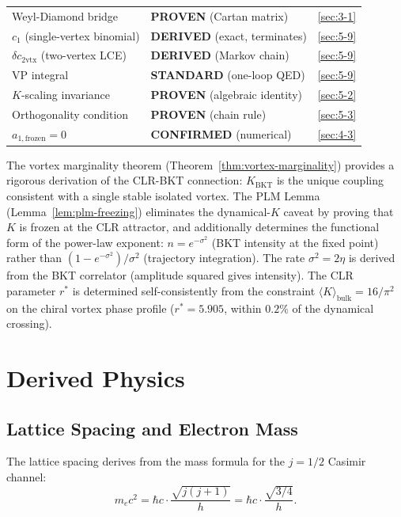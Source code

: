 \documentclass[aps,prd,onecolumn,superscriptaddress,floatfix,12pt]{revtex4-2}
\newcommand{\KBKT}{K_{\text{BKT}}}
\begin{document}
\begin{table}[t]
\begin{tabular}{llc}
Weyl-Diamond bridge & \textbf{PROVEN} (Cartan matrix) & \ref{sec:3-1} \\
$c_1$ (single-vertex binomial) & \textbf{DERIVED} (exact, terminates) & \ref{sec:5-9} \\
$\delta c_{2\text{vtx}}$ (two-vertex LCE) & \textbf{DERIVED} (Markov chain) & \ref{sec:5-9} \\
VP integral & \textbf{STANDARD} (one-loop QED) & \ref{sec:5-9} \\
$K$-scaling invariance & \textbf{PROVEN} (algebraic identity) & \ref{sec:5-2} \\
Orthogonality condition & \textbf{PROVEN} (chain rule) & \ref{sec:5-3} \\
$a_{1,\text{frozen}} = 0$ & \textbf{CONFIRMED} (numerical) & \ref{sec:4-3} \\
\bottomrule
\end{tabular}
\end{table}

The vortex marginality theorem (Theorem~\ref{thm:vortex-marginality}) provides a rigorous derivation of the CLR-BKT connection: $\KBKT$ is the unique coupling consistent with a single stable isolated vortex. The PLM Lemma (Lemma~\ref{lem:plm-freezing}) eliminates the dynamical-$K$ caveat by proving that $K$ is frozen at the CLR attractor, and additionally determines the functional form of the power-law exponent: $n = e^{-\sigma^2}$ (BKT intensity at the fixed point) rather than $(1 - e^{-\sigma^2})/\sigma^2$ (trajectory integration).  The rate $\sigma^2 = 2\eta$ is derived from the BKT correlator (amplitude squared gives intensity).  The CLR parameter $r^*$ is determined self-consistently from the constraint $\langle K \rangle_{\text{bulk}} = 16/\pi^2$ on the chiral vortex phase profile ($r^* = 5.905$, within $0.2\%$ of the dynamical crossing).

\section{Derived Physics}\label{sec:6}

\subsection{Lattice Spacing and Electron Mass}\label{sec:6-1}

The lattice spacing derives from the mass formula for the $j = 1/2$ Casimir channel:
\begin{equation}\label{eq:mass}
m_e c^2 = \hbar c \cdot \frac{\sqrt{j(j+1)}}{h} = \hbar c \cdot \frac{\sqrt{3/4}}{h}.
\end{equation}
\end{document}
